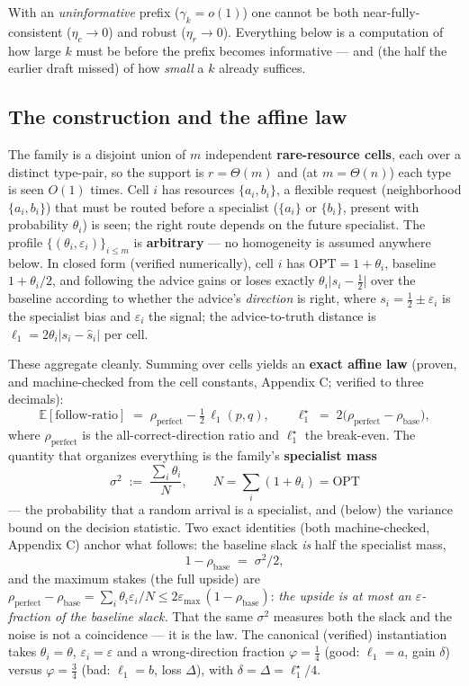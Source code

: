 With an \emph{uninformative} prefix (\(\gamma_k=o(1)\)) one cannot be
both near-fully-consistent (\(\eta_c\to0\)) and robust (\(\eta_r\to0\)).
Everything below is a computation of how large \(k\) must be before the
prefix becomes informative --- and (the half the earlier draft missed)
of how \emph{small} a \(k\) already suffices.

\subsection{The construction and the affine
law}

The family is a disjoint union of \(m\) independent
\textbf{rare-resource cells}, each over a distinct type-pair, so the
support is \(r=\Theta(m)\) and (at \(m = \Theta(n)\)) each type is seen
\(O(1)\) times. Cell \(i\) has resources \(\{a_i,b_i\}\), a flexible
request (neighborhood \(\{a_i,b_i\}\)) that must be routed before a
specialist (\(\{a_i\}\) or \(\{b_i\}\), present with probability
\(\theta_i\)) is seen; the right route depends on the future specialist.
The profile \(\{(\theta_i,\varepsilon_i)\}_{i\le m}\) is
\textbf{arbitrary} --- no homogeneity is assumed anywhere below. In
closed form (verified numerically), cell \(i\) has
\(\mathrm{OPT}=1+\theta_i\), baseline \(1+\theta_i/2\), and following
the advice gains or loses exactly \(\theta_i\lvert s_i-\tfrac12\rvert\)
over the baseline according to whether the advice's \emph{direction} is
right, where \(s_i = \tfrac12 \pm \varepsilon_i\) is the specialist bias
and \(\varepsilon_i\) the signal; the advice-to-truth distance is
\(\ell_1=2\theta_i\lvert s_i-\hat s_i\rvert\) per cell.

These aggregate cleanly. Summing over cells yields an \textbf{exact
affine law} (proven, and machine-checked from the cell constants,
Appendix C; verified to three decimals):
\[\mathbb E[\text{follow-ratio}] \;=\; \rho_{\mathrm{perfect}} - \tfrac12\,\ell_1(p,q),
\qquad \ell_1^\star \;=\; 2\big(\rho_{\mathrm{perfect}}-\rho_{\mathrm{base}}\big),\]
where \(\rho_{\mathrm{perfect}}\) is the all-correct-direction ratio and
\(\ell_1^\star\) the break-even. The quantity that organizes everything
is the family's \textbf{specialist mass}
\[\sigma^2 \;:=\; \frac{\sum_i \theta_i}{N}, \qquad N=\sum_i(1+\theta_i)=\mathrm{OPT}\]
--- the probability that a random arrival is a specialist, and (below)
the variance bound on the decision statistic. Two exact identities (both
machine-checked, Appendix C) anchor what follows: the baseline slack
\emph{is} half the specialist mass,
\[1-\rho_{\mathrm{base}} \;=\; \sigma^2/2,\] and the maximum stakes (the
full upside) are
\(\rho_{\mathrm{perfect}}-\rho_{\mathrm{base}} = \sum_i\theta_i\varepsilon_i/N
\le 2\varepsilon_{\max}\,(1-\rho_{\mathrm{base}})\): \emph{the upside is
at most an \(\varepsilon\)-fraction of the baseline slack.} That the
same \(\sigma^2\) measures both the slack and the noise is not a
coincidence --- it is the law. The canonical (verified) instantiation
takes \(\theta_i=\theta\), \(\varepsilon_i=\varepsilon\) and a
wrong-direction fraction \(\varphi=\tfrac14\) (good: \(\ell_1 = a\),
gain \(\delta\)) versus \(\varphi=\tfrac34\) (bad: \(\ell_1 = b\), loss
\(\Delta\)), with \(\delta=\Delta=\ell_1^\star/4\).

